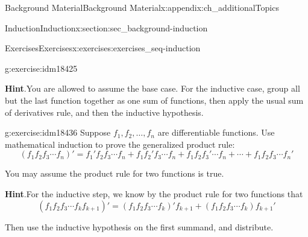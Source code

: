 \documentclass[oneside,10pt,]{book}
\numberwithin{equation}{chapter}
\begin{document}
\begin{appendixptx}{Background Material}{}{Background Material}{}{}{x:appendix:ch_additionalTopics}
\begin{sectionptx}{Induction}{}{Induction}{}{}{x:section:sec_background-induction}
\begin{exercises-subsection}{Exercises}{}{Exercises}{}{}{x:exercises:exercises_seq-induction}
\begin{divisionexercise}{22}{}{}{g:exercise:idm18425}
\par\smallskip%
\noindent\textbf{Hint}.\hypertarget{g:hint:idm18434}{}\quad{}You are allowed to assume the base case. For the inductive case, group all but the last function together as one sum of functions, then apply the usual sum of derivatives rule, and then the inductive hypothesis.%
\end{divisionexercise}%
\begin{divisionexercise}{23}{}{}{g:exercise:idm18436}%
Suppose \(f_1, f_2, \ldots, f_n\) are differentiable functions. Use mathematical induction to prove the generalized product rule:%
\begin{equation*}
(f_1 f_2 f_3 \cdots f_n)' = f_1' f_2 f_3 \cdots f_n + f_1 f_2' f_3 \cdots f_n + f_1 f_2 f_3' \cdots f_n + \cdots + f_1 f_2 f_3 \cdots f_n'
\end{equation*}
%
\par
You may assume the product rule for two functions is true.%
\par\smallskip%
\noindent\textbf{Hint}.\hypertarget{g:hint:idm18442}{}\quad{}For the inductive step, we know by the product rule for two functions that%
\begin{equation*}
(f_1f_2f_3 \cdots f_k f_{k+1})' = (f_1f_2f_3\cdots f_k)'f_{k+1} + (f_1f_2f_3\cdots f_k)f_{k+1}'
\end{equation*}
%
\par
Then use the inductive hypothesis on the first summand, and distribute.%
\end{divisionexercise}%
\end{exercises-subsection}
\end{sectionptx}
\end{appendixptx}
%
%
\typeout{************************************************}
\typeout{************************************************}
%
\end{document}

